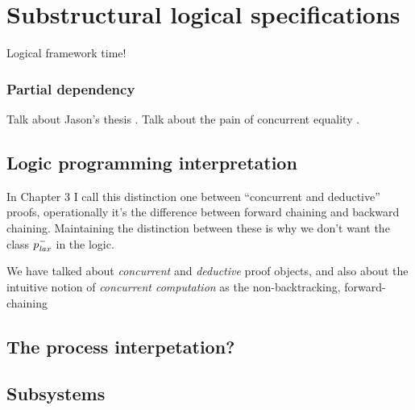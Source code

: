\chapter{Substructural logical specifications}

Logical framework time!

\subsection{Partial dependency}
\label{sec:why-not-fully-dependent}

Talk about Jason's thesis \cite{}. Talk about the pain of concurrent 
equality \cite{}.

\section{Logic programming interpretation}
\label{sec:framework-logicprog}

In Chapter 3 I call this distinction one between ``concurrent and deductive''
proofs, operationally it's the difference between forward chaining 
and backward chaining. Maintaining the distinction between these is why
we don't want the class $p^-_{\it lax}$ in the logic.

We have talked about {\it concurrent} and {\it deductive} proof
objects, and also about the intuitive notion of {\it concurrent
  computation} as the non-backtracking, forward-chaining 


\section{The process interpetation?}

\section{Subsystems}

